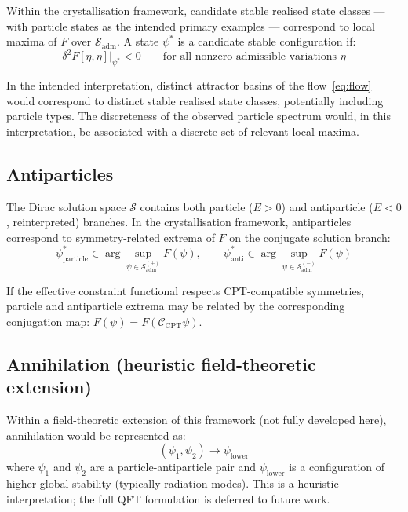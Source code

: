 \documentclass[12pt]{article}
\begin{document}
Within the crystallisation framework, candidate stable realised state classes --- with particle states as the intended primary examples --- correspond to local maxima of $F$ over $\mathcal{S}_{\mathrm{adm}}$. A state $\psi^*$ is a candidate stable configuration if:
\begin{equation}
    \delta^2 F[\eta,\eta]\big|_{\psi^*} < 0 \qquad \text{for all nonzero admissible variations } \eta
\end{equation}

In the intended interpretation, distinct attractor basins of the flow~\eqref{eq:flow} would correspond to distinct stable realised state classes, potentially including particle types. The discreteness of the observed particle spectrum would, in this interpretation, be associated with a discrete set of relevant local maxima.

\subsection{Antiparticles}

The Dirac solution space $\mathcal{S}$ contains both particle ($E > 0$) and antiparticle ($E < 0$, reinterpreted) branches. In the crystallisation framework, antiparticles correspond to symmetry-related extrema of $F$ on the conjugate solution branch:
\begin{equation}
    \psi^*_{\text{particle}} \in \arg\sup_{\psi \in \mathcal{S}^{(+)}_{\mathrm{adm}}} F(\psi), \qquad
    \psi^*_{\text{anti}} \in \arg\sup_{\psi \in \mathcal{S}^{(-)}_{\mathrm{adm}}} F(\psi)
\end{equation}

If the effective constraint functional respects CPT-compatible symmetries, particle and antiparticle extrema may be related by the corresponding conjugation map: $F(\psi) = F(\mathcal{C}_{\text{CPT}}\psi)$.

\subsection{Annihilation (heuristic field-theoretic extension)}

Within a field-theoretic extension of this framework (not fully developed here), annihilation would be represented as:
\begin{equation}
    (\psi_1, \psi_2) \to \psi_{\text{lower}}
\end{equation}
where $\psi_1$ and $\psi_2$ are a particle-antiparticle pair and $\psi_{\text{lower}}$ is a configuration of higher global stability (typically radiation modes). This is a heuristic interpretation; the full QFT formulation is deferred to future work.
\end{document}
